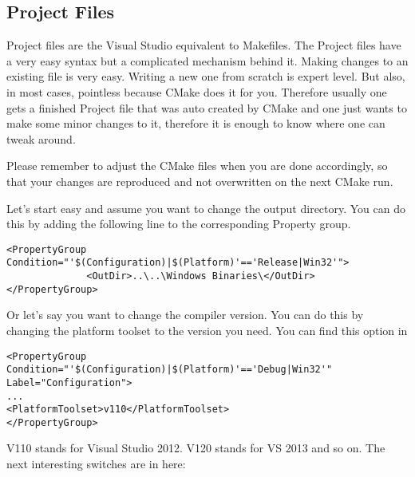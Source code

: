 \subsection{Project Files}
Project files are the Visual Studio equivalent to Makefiles. The
Project files have a very easy syntax but a complicated mechanism
behind it. Making changes to an existing file is very easy. Writing a
new one from scratch is expert level. But also, in most cases,
pointless because CMake does it for you. Therefore usually one gets a
finished Project file that was auto created by CMake and one just
wants to make some minor changes to it, therefore it is enough to know
where one can tweak around.

Please remember to adjust the CMake files when you are done
accordingly, so that your changes are reproduced and not overwritten on the next CMake run.

Let's start easy and assume you want to change the output directory. You can do this by adding the following line to the corresponding Property group. 

\lstset{language=XML}
\begin{lstlisting}
<PropertyGroup Condition="'$(Configuration)|$(Platform)'=='Release|Win32'">   
              <OutDir>..\..\Windows Binaries\</OutDir>
</PropertyGroup>

\end{lstlisting}

Or let's say you want to change the compiler version. You can do this by changing the platform toolset to the version you need. You can find this option in 
\lstset{language=XML}
\begin{lstlisting}
<PropertyGroup Condition="'$(Configuration)|$(Platform)'=='Debug|Win32'" Label="Configuration">
...
<PlatformToolset>v110</PlatformToolset>
</PropertyGroup>
\end{lstlisting}

V110 stands for Visual Studio 2012. V120 stands for VS 2013 and so on.
The next interesting switches are in here:

